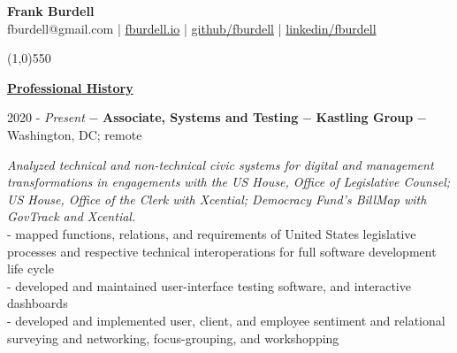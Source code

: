\documentclass[8pt]{article}
\begin{document}
\begin{center}
\thispagestyle{empty}
	\textbf{Frank Burdell} \\[0pt]
	fburdell@gmail.com | \href{https://fburdell.github.io}{fburdell.io} | \href{https://github.com/fburdell/}{github/fburdell} | \href{https://www.linkedin.com/in/fburdell/}{linkedin/fburdell}

\line(1,0){550}\\[10pt]
\end{center}

\begin{center}
	\textbf{\underline{\Large{Professional History}}}
\end{center}

2020 - \textit{Present} $-$ \textbf{Associate, Systems and Testing} $-$ \textbf{Kastling Group} $-$ Washington, DC; remote

\begin{adjustwidth}{1cm}{1cm}
	\textit{Analyzed technical and non-technical civic systems for digital and management transformations in engagements with the US House, Office of Legislative Counsel; US House, Office of the Clerk with Xcential; Democracy Fund's BillMap with GovTrack and Xcential.} \\
	- mapped functions, relations, and requirements of United States legislative processes and respective technical interoperations for full software development life cycle \\
	- developed and maintained user-interface testing software, and interactive dashboards \\
	- developed and implemented user, client, and employee sentiment and relational surveying and networking, focus-grouping, and workshopping \\


\end{adjustwidth}
\end{document}
